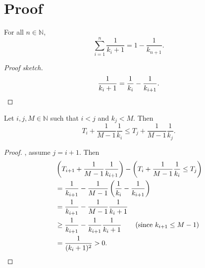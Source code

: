 \section{Proof}
\label{sec:proof}

\begin{lemma}
\label{thm:t2-simp}
For all $n \in \mathbb{N}$,
\[ \sum_{i=1}^n \frac{1}{k_i + 1} = 1 - \frac{1}{k_{n+1}}. \]
\end{lemma}
\begin{proof}[Proof sketch]
\[ \frac{1}{k_i + 1} = \frac{1}{k_i} - \frac{1}{k_{i+1}}.
\qedhere \]
\end{proof}

\begin{lemma}
\label{thm:tplus-monotone}
Let $i, j, M \in \mathbb{N}$ such that $i < j$ and $k_j < M$. Then
\[ T_i + \frac{1}{M-1}\frac{1}{k_i} \le T_j + \frac{1}{M-1}\frac{1}{k_j}. \]
\end{lemma}
\begin{proof}
\WLoG, assume $j = i+1$. Then
\begin{align*}
& \left(T_{i+1} + \frac{1}{M-1}\frac{1}{k_{i+1}}\right) - \left(T_i + \frac{1}{M-1}\frac{1}{k_i} \le T_j\right)
\\ &= \frac{1}{k_{i+1}} - \frac{1}{M-1}\left(\frac{1}{k_i} - \frac{1}{k_{i+1}}\right)
\\ &= \frac{1}{k_{i+1}} - \frac{1}{M-1}\frac{1}{k_i+1}
\\ &\ge \frac{1}{k_{i+1}} - \frac{1}{k_{i+1}}\frac{1}{k_i+1}
    \tag{since $k_{i+1} \le M-1$}
\\ &= \frac{1}{(k_i+1)^2} > 0.
\qedhere
\end{align*}
\end{proof}

